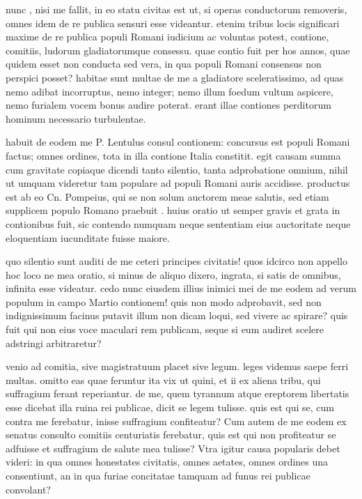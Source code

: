  nunc , nisi me fallit, in eo statu civitas est ut, si operas conductorum removeris, omnes idem de re publica sensuri esse videantur. etenim tribus locis significari maxime de re publica populi Romani iudicium ac voluntas potest, contione, comitiis, ludorum gladiatorumque consessu. quae contio fuit per hos annos, quae quidem esset non conducta sed vera, in qua populi Romani consensus non perspici posset? habitae sunt multae de me a gladiatore sceleratissimo, ad quas nemo adibat incorruptus, nemo integer; nemo illum foedum vultum aspicere, nemo furialem vocem bonus audire poterat. erant illae contiones perditorum hominum necessario turbulentae.

 habuit de eodem me P. Lentulus consul contionem: concursus est populi Romani factus; omnes ordines, tota in illa contione Italia constitit. egit causam summa cum gravitate copiaque dicendi tanto silentio, tanta adprobatione omnium, nihil ut umquam videretur tam populare ad populi Romani auris accidisse. productus est ab eo Cn. Pompeius, qui se non solum auctorem meae salutis, sed etiam supplicem populo Romano praebuit . huius oratio ut semper gravis et grata in contionibus fuit, sic contendo numquam neque sententiam eius auctoritate neque eloquentiam iucunditate fuisse maiore.

 quo silentio sunt auditi de me ceteri principes civitatis! quos idcirco non appello hoc loco ne mea oratio, si minus de aliquo dixero, ingrata, si satis de omnibus, infinita esse videatur. cedo nunc eiusdem illius inimici mei de me eodem ad verum populum in campo Martio contionem! quis non modo adprobavit, sed non indignissimum facinus putavit illum non dicam loqui, sed vivere ac spirare? quis fuit qui non eius voce maculari rem publicam, seque si eum audiret scelere adstringi arbitraretur?

 venio ad comitia, sive magistratuum placet sive legum. leges videmus saepe ferri multas. omitto eas quae feruntur ita vix ut quini, et ii ex aliena tribu, qui suffragium ferant reperiantur. de me, quem tyrannum atque ereptorem libertatis esse dicebat illa ruina rei publicae, dicit se legem tulisse. quis est qui se, cum contra me ferebatur, inisse suffragium confiteatur? Cum autem de me eodem ex senatus consulto comitiis centuriatis ferebatur, quis est qui non profiteatur se adfuisse et suffragium de salute mea tulisse? Vtra igitur causa popularis debet videri: in qua omnes honestates civitatis, omnes aetates, omnes ordines una consentiunt, an in qua furiae concitatae tamquam ad funus rei publicae convolant?

